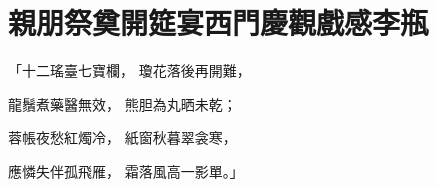 %

\chapter{親朋祭奠開筵宴\KG 西門慶觀戲感李瓶}


\begin{showcontents}{}



「十二瑤臺七寶欄，  瓊花落後再開難，

龍鬚煮藥醫無效，  熊胆為丸晒未乾；

蓉帳夜愁紅燭冷，  紙窗秋暮翠衾寒，

應憐失伴孤飛雁，  霜落風高一影單。」


\end{showcontents}
